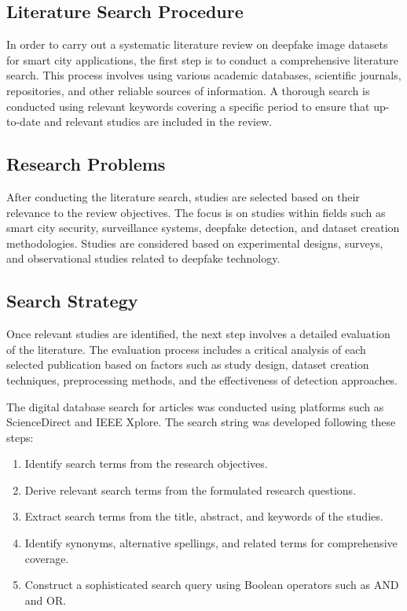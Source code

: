 \documentclass{article} %
\begin{document}
\subsection{Literature Search Procedure}
In order to carry out a systematic literature review on deepfake image datasets for smart city applications, the first step is to conduct a comprehensive literature search. This process involves using various academic databases, scientific journals, repositories, and other reliable sources of information. A thorough search is conducted using relevant keywords covering a specific period to ensure that up-to-date and relevant studies are included in the review.

\subsection{Research Problems}
After conducting the literature search, studies are selected based on their relevance to the review objectives. The focus is on studies within fields such as smart city security, surveillance systems, deepfake detection, and dataset creation methodologies. Studies are considered based on experimental designs, surveys, and observational studies related to deepfake technology.

\subsection{Search Strategy}
Once relevant studies are identified, the next step involves a detailed evaluation of the literature. The evaluation process includes a critical analysis of each selected publication based on factors such as study design, dataset creation techniques, preprocessing methods, and the effectiveness of detection approaches.

The digital database search for articles was conducted using platforms such as ScienceDirect and IEEE Xplore. The search string was developed following these steps:

\begin{enumerate}
\item Identify search terms from the research objectives.
\item Derive relevant search terms from the formulated research questions.
\item Extract search terms from the title, abstract, and keywords of the studies.
\item Identify synonyms, alternative spellings, and related terms for comprehensive coverage.
\item Construct a sophisticated search query using Boolean operators such as AND and OR.
\end{enumerate}
\end{document}
